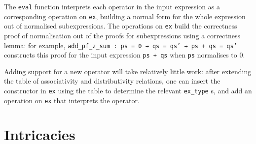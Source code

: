 \documentclass{llncs}
\newcommand{\lean}[1]{\texttt{#1}\xspace} %
\newcommand{\ex}{\lean{ex}}
\newcommand{\ring}{\lean{ring}}
\newcommand{\ringexp}{\lean{ring\_exp}}
\begin{document}
The \lean{eval} function interprets each operator in the input expression as a corresponding operation on \ex,
building a normal form for the whole expression out of normalised subexpressions.
The operations on \ex build the correctness proof of normalisation out of the proofs for subexpressions
using a correctness lemma: for example, \lean{add\_pf\_z\_sum : ps = 0 → qs = qs' → ps + qs = qs'} constructs this proof for the input expression \lean{ps + qs} when \lean{ps} normalises to $0$.

Adding support for a new operator will take relatively little work:
after extending the table of associativity and distributivity relations,
one can insert the constructor in \ex using the table to determine the relevant \lean{ex\_type}s,
and add an operation on \ex that interprets the operator.


\section{Intricacies}
\end{document}
